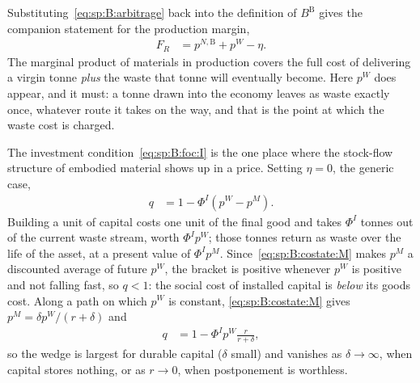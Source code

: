 Substituting~\eqref{eq:sp:B:arbitrage} back into the definition of $B^{\mathrm B}$ gives the companion
statement for the production margin,
\begin{align}
F_R &= p^{N,\mathrm B}+p^W-\eta .
\label{eq:sp:B:FR}
\end{align}
The marginal product of materials in production covers the full cost of delivering a virgin tonne
\emph{plus} the waste that tonne will eventually become. Here $p^W$ does appear, and it must: a tonne
drawn into the economy leaves as waste exactly once, whatever route it takes on the way, and that is
the point at which the waste cost is charged.

\label{sec:sp:B:signs}
The investment condition~\eqref{eq:sp:B:foc:I} is the one place where the stock-flow structure of
embodied material shows up in a price. Setting $\eta=0$, the generic case,
\begin{align}
q &= 1-\Phi^I\left(p^W-p^M\right).
\label{eq:sp:B:q}
\end{align}
Building a unit of capital costs one unit of the final good and takes $\Phi^I$ tonnes out of the
current waste stream, worth $\Phi^Ip^W$; those tonnes return as waste over the life of the asset, at a
present value of $\Phi^Ip^M$. Since~\eqref{eq:sp:B:costate:M} makes $p^M$ a discounted average of
future $p^W$, the bracket is positive whenever $p^W$ is positive and not falling fast, so $q<1$: the
social cost of installed capital is \emph{below} its goods cost. Along a path on which $p^W$ is
constant, \eqref{eq:sp:B:costate:M} gives $p^M=\delta p^W/\left(r+\delta\right)$ and
\begin{align}
q &= 1-\Phi^Ip^W\frac{r}{r+\delta},
\label{eq:sp:B:q-stationary}
\end{align}
so the wedge is largest for durable capital ($\delta$ small) and vanishes as $\delta\to\infty$, when
capital stores nothing, or as $r\to0$, when postponement is worthless.

